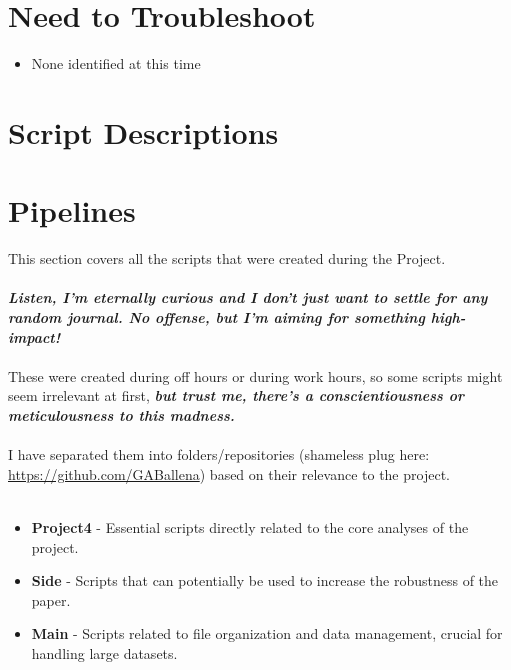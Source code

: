 \documentclass[11pt]{article}
\begin{document}
	\section{Need to Troubleshoot}
	\begin{itemize}
		\item None identified at this time
	\end{itemize}


\newpage
\onecolumn

\newpage
\onecolumn

\section*{\centering \huge \textbf{Script Descriptions}}  %

\section*{Pipelines}  %
This section covers all the scripts that were created during the Project.
\\
\\
\textit{\textbf{Listen, I’m eternally curious and I don't just want to settle for any random journal. No offense, but I’m aiming for something high-impact!}} 
\\
\\
These were created during off hours or during work hours, so some scripts might seem irrelevant at first, \textbf{\textit{but trust me, there's a conscientiousness or meticulousness to this madness.}}
\\
\\
I have separated them into folders/repositories (shameless plug here: \href{https://github.com/GABallena}{https://github.com/GABallena}) based on their relevance to the project.
\\
\\
\begin{itemize}
	\item \textbf{Project4} - Essential scripts directly related to the core analyses of the project.
	\item \textbf{Side} - Scripts that can potentially be used to increase the robustness of the paper.
	\item \textbf{Main} - Scripts related to file organization and data management, crucial for handling large datasets.
\end{itemize}
\end{document}
